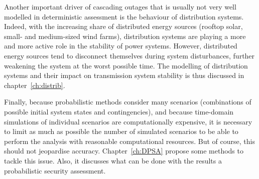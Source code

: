 Another important driver of cascading outages that is usually not very well modelled in deterministic assessment is the behaviour of distribution systems. Indeed, with the increasing share of distributed energy sources (rooftop solar, small- and medium-sized wind farms), distribution systems are playing a more and more active role in the stability of power systems. However, distributed energy sources tend to disconnect themselves during system disturbances, further weakening the system at the worst possible time. The modelling of distribution systems and their impact on transmission system stability is thus discussed in chapter~\ref{ch:distrib}.

Finally, because probabilistic methods consider many scenarios (combinations of possible initial system states and contingencies), and because time-domain simulations of individual scenarios are computationally expensive, it is necessary to limit as much as possible the number of simulated scenarios to be able to perform the analysis with reasonable computational resources. But of course, this should not jeopardise accuracy. Chapter~\ref{ch:DPSA} propose some methods to tackle this issue. Also, it discusses what can be done with the results a probabilistic security assessment.
